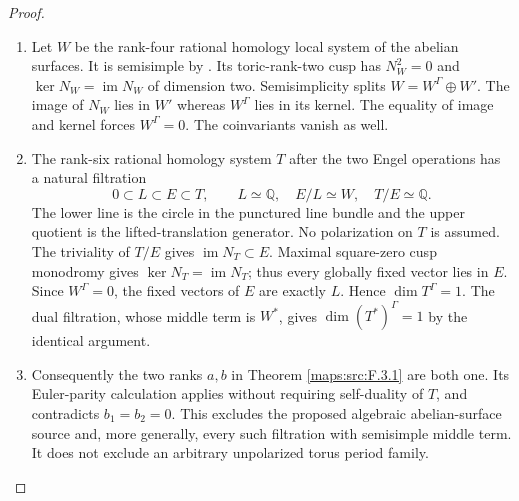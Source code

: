 \documentclass[11pt,a4paper]{article}
\theoremstyle{definition}
\begin{document}
\begin{proof}
\begin{enumerate}[label=\arabic*.]
\item Let $W$ be the rank-four rational homology local system of the
abelian surfaces.  It is semisimple by
\cite[Definition 4.2.4 and Proposition 4.2.5, p.~44; Theorem 4.2.6, p.~45]{ffDeligne}.
Its toric-rank-two cusp has
$N_W^2=0$ and $\ker N_W=\operatorname{im}N_W$ of dimension two.
Semisimplicity splits $W=W^\Gamma\oplus W'$.
The image of $N_W$ lies in $W'$ whereas $W^\Gamma$ lies in its
kernel.  The equality of image and kernel forces $W^\Gamma=0$.
The coinvariants vanish as well.

\item The rank-six rational homology system $T$ after the two Engel
operations has a natural filtration
\[
 0\subset L\subset E\subset T,\qquad
 L\simeq\mathbb Q,\quad E/L\simeq W,\quad T/E\simeq\mathbb Q.
\]
The lower line is the circle in the punctured line bundle and
the upper quotient is the lifted-translation generator.
No polarization on $T$ is assumed.
The triviality of $T/E$ gives $\operatorname{im}N_T\subset E$.
Maximal square-zero cusp monodromy gives
$\ker N_T=\operatorname{im}N_T$; thus every globally fixed vector
lies in $E$.  Since $W^\Gamma=0$, the fixed vectors of $E$ are
exactly $L$.  Hence $\dim T^\Gamma=1$.
The dual filtration, whose middle term is $W^*$, gives
$\dim(T^*)^\Gamma=1$ by the identical argument.

\item Consequently the two ranks $a,b$ in Theorem \ref{maps:src:F.3.1} are both one.
Its Euler-parity calculation applies without requiring self-duality
of $T$, and contradicts $b_1=b_2=0$.
This excludes the proposed algebraic abelian-surface source and,
more generally, every such filtration with semisimple middle term.
It does not exclude an arbitrary unpolarized torus period family.

\end{enumerate}
\end{proof}
\end{document}
